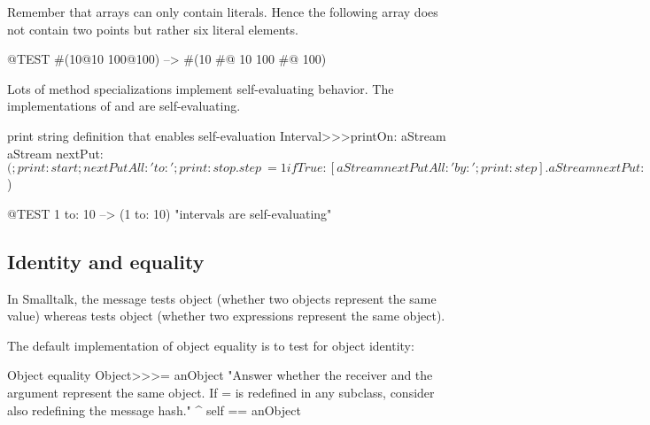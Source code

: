 \documentclass[a4paper,10pt,twoside]{book}
\begin{document}
Remember that  arrays can only contain literals.
Hence the following array does not contain two points but rather six literal elements.
\begin{code}{@TEST}
#(10@10 100@100) --> #(10 #@ 10 100 #@ 100)
\end{code}

Lots of  method specializations implement self-evaluating behavior.
The implementations of  and  are self-evaluating.


\begin{method}{ print string definition that enables self-evaluation}
Interval>>>printOn: aStream
    aStream nextPut: $(;
        print: start;
        nextPutAll: ' to: ';
        print: stop.
    step ~= 1 ifTrue: [aStream nextPutAll: ' by: '; print: step].
    aStream nextPut: $)
\end{method}

\begin{code}{@TEST}
1 to: 10 --> (1 to: 10)    "intervals are self-evaluating"
\end{code}

\subsection{Identity and equality}

In Smalltalk, the message \ct{=} tests object  (\ie whether two objects represent the same value) whereas \ct{==} tests object  (\ie whether two expressions represent the same object).

The default implementation of object equality is to test for object identity:
\begin{method}{Object equality}
Object>>>= anObject
    "Answer whether the receiver and the argument represent the same object.
    If = is redefined in any subclass, consider also redefining the message hash."
    ^ self == anObject
\end{method}
\end{document}
